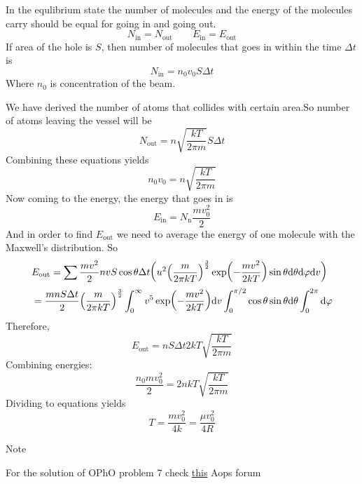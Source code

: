\documentclass[a4paper, 12pt]{article}
\begin{document}
\begin{sol}
    In the equlibrium state the number of molecules and the energy of the molecules carry should be equal for going in and going out.
    $$N_{\text{in}}=N_{\text{out}}\qquad E_{\text{in}} =E_{\text{out}}$$
    If area of the hole is $S$, then number of molecules that goes in within the time $\Delta t$ is
    $$N_{\text{in}} =n_0v_0S\Delta t$$
    Where $n_0$ is concentration of the beam.

    We have derived the number of atoms that collides with certain area.So number of atoms leaving the vessel
    will be $$N_{\text{out}} = n\sqrt{\frac{kT}{2\pi m}}S\Delta t$$
    Combining these equations yields $$n_0v_0=n\sqrt{\frac{kT}{2\pi m}}$$ Now coming to the energy, the energy that goes in is 
    $$E_{\text{in}}=N_{\text{n}}\frac{mv_0^2}{2}$$ And in order to find $E_{\text{out}}$ we need to average the energy of one molecule with the Maxwell's distribution. So
    \begin{align*}
        &E_{\text{out}} = \sum\frac{mv^2}{2}nvS\cos\theta\Delta t\qty(u^2\qty(\frac{m}{2\pi kT})^{\frac{3}{2}}\exp(-\frac{mv^2}{2kT})\sin\theta\dd\theta\dd\varphi\dd v)\\
        &=\frac{mnS\Delta t}{2}\qty(\frac{m}{2\pi kT})^{\frac{3}{2}}\int_0^\infty v^5\exp(-\frac{mv^2}{2kT})\dd v\int_0^{\pi/2}\cos\theta\sin\theta\dd\theta\int_0^{2\pi}\dd\varphi
    \end{align*}
    Therefore,$$E_{\text{out}} = nS\Delta t 2kT\sqrt{\frac{kT}{2\pi m}}$$
    Combining energies:
    $$\frac{n_0mv_0^2}{2}=2nkT\sqrt{\frac{kT}{2\pi m}}$$
    Dividing to equations yields $$T=\frac{mv_0^2}{4k}=\frac{\mu v_0^2}{4R}$$
\end{sol}

\noindent Note

\noindent For the solution of OPhO problem 7 check \href{https://artofproblemsolving.com/community/c1222116_opho_invitational_round}{this} Aops forum 
\end{document}
